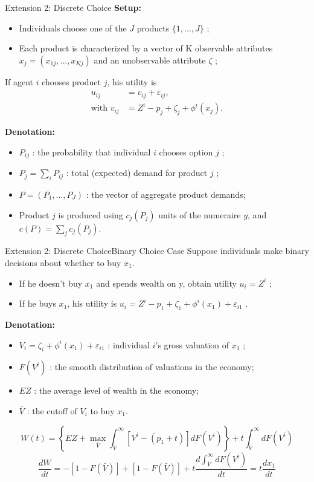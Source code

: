 \documentclass{beamer}
\begin{document}
\begin{frame}{Extension 2: Discrete Choice}
	\textbf{Setup:}
	\begin{itemize}
		\item Individuals choose one of the $J$ products $\{1,...,J\}$ ;
		\item Each product is characterized by a vector of K observable attributes $x_j=(x_{1j},...,x_{Kj})$ and an unobservable attribute $\zeta$ ;
	\end{itemize}
	If agent $i$ chooses product $j$, his utility is
	\begin{equation}
		\begin{aligned}
			u_{ij} &= v_{ij} + \varepsilon_{ij}, \\
			\mbox{with } v_{ij} &= Z^i - p_j + \zeta_j + \phi^i(x_j).
		\end{aligned}
	\end{equation}

	\textbf{Denotation:}
	\begin{itemize}
		\item $P_{ij}$ : the probability that individual $i$ chooses option $j$ ;
		\item $P_j=\sum_i P_{ij}$ : total (expected) demand for product $j$ ;
		\item $P=(P_1,...,P_J)$ : the vector of aggregate product demands;
		\item Product $j$ is produced using $c_j(P_j)$ units of the numeraire $y$, and $c(P)=\sum_j c_j(P_j)$.
	\end{itemize}
\end{frame}
\begin{frame}{Extension 2: Discrete Choice}{Binary Choice Case}
	Suppose individuals make binary decisions about whether to buy $x_1$.
	\begin{itemize}
		\item If he doesn't buy $x_1$ and spends wealth on y, obtain utility $u_i = Z^i$ ;
		\item If he buys $x_1$, his utility is $u_i=Z^i-p_1+\zeta_1+\phi^i(x_1)+\varepsilon_{i1}$ .
	\end{itemize}
	\textbf{Denotation:}
	\begin{itemize}
		\item $V_i=\zeta_i+\phi^i(x_1)+\varepsilon_{i1}$ : individual $i$'s gross valuation of $x_1$ ;
		\item $F(V^i)$ : the smooth distribution of valuations in the economy;
		\item $EZ$ : the average level of wealth in the economy;
		\item $\bar{V}$ : the cutoff of $V_i$ to buy $x_1$.
	\end{itemize}
	\begin{equation}
		W(t) = \left\{EZ + \max_{\bar{V}}\int_{\bar{V}}^\infty\left[V^i-(p_1+t)\right]dF(V^i)\right\} + t\int_{\bar{V}}^\infty dF(V^i)
	\end{equation}
	\begin{equation}
		\frac{dW}{dt} = -\left[1-F(\bar{V})\right] + \left[1-F(\bar{V})\right] + t\frac{d\int_{\bar{V}}^\infty dF(V^i)}{dt} = t\frac{dx_1}{dt}
	\end{equation}
\end{frame}
\end{document}

